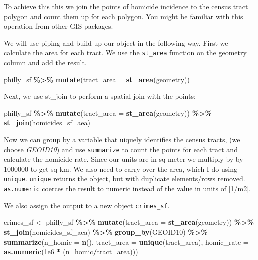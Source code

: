 \documentclass[
]{book}
\newenvironment{Shaded}{\begin{snugshade}}{\end{snugshade}}
\newcommand{\AttributeTok}[1]{\textcolor[rgb]{0.13,0.29,0.53}{#1}}
\newcommand{\FloatTok}[1]{\textcolor[rgb]{0.00,0.00,0.81}{#1}}
\newcommand{\FunctionTok}[1]{\textcolor[rgb]{0.13,0.29,0.53}{\textbf{#1}}}
\newcommand{\NormalTok}[1]{#1}
\newcommand{\OtherTok}[1]{\textcolor[rgb]{0.56,0.35,0.01}{#1}}
\newcommand{\SpecialCharTok}[1]{\textcolor[rgb]{0.81,0.36,0.00}{\textbf{#1}}}
\begin{document}
To achieve this this we join the points of homicide incidence to the census tract polygon and count them up for each polygon. You might be familiar with this operation from other GIS packages.

We will use piping and build up our object in the following way. First we calculate the area for each tract. We use the \texttt{st\_area} function on the geometry column and add the result.

\begin{Shaded}
\begin{Highlighting}[]
\NormalTok{philly\_sf }\SpecialCharTok{\%\textgreater{}\%} 
  \FunctionTok{mutate}\NormalTok{(}\AttributeTok{tract\_area =} \FunctionTok{st\_area}\NormalTok{(geometry)) }
\end{Highlighting}
\end{Shaded}

Next, we use st\_join to perform a spatial join with the points:

\begin{Shaded}
\begin{Highlighting}[]
\NormalTok{philly\_sf }\SpecialCharTok{\%\textgreater{}\%} 
  \FunctionTok{mutate}\NormalTok{(}\AttributeTok{tract\_area =} \FunctionTok{st\_area}\NormalTok{(geometry)) }\SpecialCharTok{\%\textgreater{}\%} 
  \FunctionTok{st\_join}\NormalTok{(homicides\_sf\_aea) }
\end{Highlighting}
\end{Shaded}

Now we can group by a variable that uiquely identifies the census tracts, (we choose \emph{GEOID10}) and use \texttt{summarize} to count the points for each tract and calculate the homicide rate. Since our units are in sq meter we multiply by by 1000000 to get sq km. We also need to carry over the area, which I do using \texttt{unique}. \texttt{unique} returns the object, but with duplicate elements/rows removed. \texttt{as.numeric} coerces the result to numeric instead of the value in units of {[}1/m2{]}.

We also assign the output to a new object \texttt{crimes\_sf}.

\begin{Shaded}
\begin{Highlighting}[]
\NormalTok{crimes\_sf }\OtherTok{\textless{}{-}}\NormalTok{ philly\_sf }\SpecialCharTok{\%\textgreater{}\%}
      \FunctionTok{mutate}\NormalTok{(}\AttributeTok{tract\_area =} \FunctionTok{st\_area}\NormalTok{(geometry)) }\SpecialCharTok{\%\textgreater{}\%}
      \FunctionTok{st\_join}\NormalTok{(homicides\_sf\_aea) }\SpecialCharTok{\%\textgreater{}\%}
      \FunctionTok{group\_by}\NormalTok{(GEOID10) }\SpecialCharTok{\%\textgreater{}\%}
      \FunctionTok{summarize}\NormalTok{(}\AttributeTok{n\_homic =} \FunctionTok{n}\NormalTok{(),}
                \AttributeTok{tract\_area =} \FunctionTok{unique}\NormalTok{(tract\_area),}
                \AttributeTok{homic\_rate =} \FunctionTok{as.numeric}\NormalTok{(}\FloatTok{1e6} \SpecialCharTok{*}\NormalTok{ (n\_homic}\SpecialCharTok{/}\NormalTok{tract\_area))) }
\end{Highlighting}
\end{Shaded}
\end{document}
